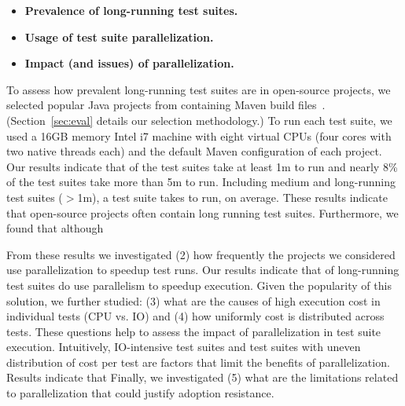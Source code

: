 \begin{itemize}
\item \textbf{Prevalence of long-running test suites.}
\item \textbf{Usage of test suite parallelization.}  
\item \textbf{Impact (and issues) of parallelization.}  
\end{itemize}  



To assess how prevalent long-running test suites are in open-source
projects, we selected \numSubjs{} popular Java projects from \github{}
containing Maven build files~\cite{maven}.  (Section~\ref{sec:eval}
details our selection methodology.)  To run each test suite, we used a
16GB memory Intel i7 machine with
eight virtual CPUs (four cores with two native threads each) and the
default Maven configuration of each project.  Our results indicate
that \percentMedLongRunning{} of the test suites take at least 1m to
run and nearly 8\% of the test suites take more than 5m to run.
Including medium and long-running test suites ($>$1m), a test suite
takes \averageMedLongRunning{} to run, on average.  These results
indicate that open-source projects often contain long running test
suites.  Furthermore, we found that although 

  From these results we
investigated (2) how frequently the projects we considered use
parallelization to speedup test runs.  Our results indicate that
\percentParallelForLongRunning{} of long-running test suites do use
parallelism to speedup execution.  Given the popularity of this
solution, we further studied: (3) what are the causes of high
execution cost in individual tests (CPU vs. IO) and (4) how uniformly
cost is distributed across tests.  These questions help to assess the
impact of parallelization in test suite execution.  Intuitively,
IO-intensive test suites and test suites with uneven distribution of
cost per test are factors that limit the benefits of parallelization.
Results indicate that   Finally, we investigated (5) what are
the limitations related to parallelization that could justify adoption
resistance.

